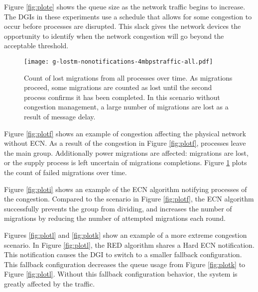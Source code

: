 Figure \ref{fig:plote} shows the queue size as the network traffic begins to increase.
The \ac{DGI}s in these experiments use a schedule that allows for some congestion to occur before processes are disrupted.
This slack gives the network devices the opportunity to identify when the network congestion will go beyond the acceptable threshold.

\begin{figure}
\texttt{[image: g-lostm-nonotifications-4mbpstraffic-all.pdf]}
\caption{Count of lost migrations from all processes over time. As migrations proceed, some migrations are counted as lost until the second process confirms it has been completed. In this scenario without congestion management, a large number of migrations are lost as a result of message delay.}
\label{fig:plotg}
\end{figure}

Figure \ref{fig:plotf} shows an example of congestion affecting the physical network without \ac{ECN}.
As a result of the congestion in Figure \ref{fig:plotf}, processes leave the main group.
Additionally power migrations are affected: migrations are lost, or the supply process is left uncertain of migrations completions.
Figure \ref{fig:plotg} plots the count of failed migrations over time.

Figure \ref{fig:ploti} shows an example of the \ac{ECN} algorithm notifying processes of the congestion.
Compared to the scenario in Figure \ref{fig:plotf}, the \ac{ECN} algorithm successfully prevents the group from dividing, and increases the number of migrations by reducing the number of attempted migrations each round.

Figures \ref{fig:plotl} and \ref{fig:plotk} show an example of a more extreme congestion scenario.
In Figure \ref{fig:plotl}, the \ac{RED} algorithm shares a Hard \ac{ECN} notification.
This notification causes the \ac{DGI} to switch to a smaller fallback configuration.
This fallback configuration decreases the queue usage from Figure \ref{fig:plotk} to Figure \ref{fig:plotl}.
Without this fallback configuration behavior, the system is greatly affected by the traffic.

